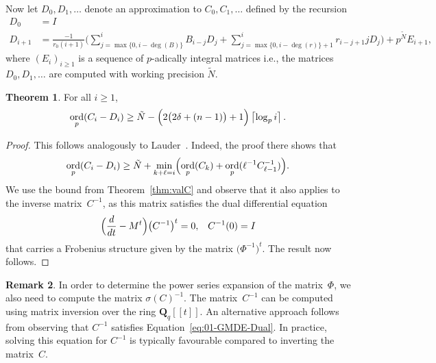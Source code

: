 \documentclass[a4paper,11pt]{article}
\numberwithin{equation}{section}
\providecommand{\ceil}[1]{\left\lceil#1\right\rceil}   %
\DeclareMathOperator{\ord}{ord}          %
\theoremstyle{definition}
\newtheorem{thm}{Theorem}[section]
\newtheorem{rem}[thm]{Remark}
\begin{document}
Now let $D_0, D_1, \dotsc$ denote an approximation to $C_0, C_1, \dotsc$ 
defined by the recursion
\begin{align*}
D_0 &= I \\
D_{i+1} &= \frac{-1}{r_0 (i+1)} \biggl(
    \sum_{j=\max{\{0,i-\deg(B)\}}}^i B_{i-j} D_j + 
    \sum_{j=\max{\{0,i-\deg(r)\}}+1}^i r_{i-j+1} j D_j \biggr) + 
    p^{\tilde{N}} E_{i+1},
\end{align*}
where $(E_i)_{i \geq 1}$ is a sequence of $p$-adically integral matrices i.e., the matrices $D_0, D_1, \dotsc$
are computed with working precision $\tilde{N}$.

\begin{thm}
For all $i \geq 1$, 
\begin{equation*}
\ord_p(C_i - D_i) \geq 
    \tilde{N} - \Bigl(2 \bigl(2 \delta + (n-1)\bigr) + 1\Bigr) \ceil{\log_p i}.
\end{equation*}
\end{thm}

\begin{proof}
This follows analogously to
Lauder~\citep[Theorem~5.1]{Lauder2006}.  
Indeed, the proof there shows that 
\begin{equation*}
\ord_p(C_i - D_i) \geq 
    \tilde{N} + \min_{k+\ell=i} \Bigl(\ord_p(C_k) + 
                                      \ord_p(\ell^{-1} C_{\ell-1}^{-1})\Bigr).
\end{equation*}
We use the bound from Theorem~\ref{thm:valC} and observe that it 
also applies to the inverse matrix~$C^{-1}$, as this matrix satisfies 
the dual differential equation 
\begin{equation} \label{eq:01-GMDE-Dual}
\Bigl(\frac{d}{dt} - M^t\Bigr) \bigl(C^{-1}\bigr)^t = 0, \; \; \; C^{-1}(0)=I
\end{equation}
that carries a Frobenius structure given by the matrix $\bigl(\Phi^{-1}\bigr)^t$. 
The result now follows.
\end{proof}

\begin{rem}
In order to determine the power series expansion of the matrix~$\Phi$, 
we also need to compute the matrix $\sigma(C)^{-1}$. The matrix~$C^{-1}$ 
can be computed using matrix inversion over the ring $\mathbf{Q}_q[[t]]$.  
An alternative approach follows from observing that $C^{-1}$ 
satisfies Equation~\eqref{eq:01-GMDE-Dual}. In practice, solving this 
equation for $C^{-1}$ is typically favourable compared to inverting 
the matrix~$C$.
\end{rem}
\end{document}
